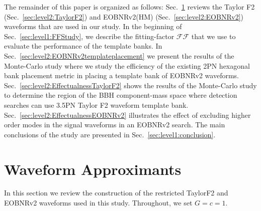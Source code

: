 \documentclass[aps,
prd,
amsmath,
amssymb,
twocolumn,
floatfix,
groupedaddress]{revtex4-1}
\newcommand{\FF}{\mathcal{FF}}
\begin{document}
The remainder of this paper is organized as follows: Sec.~\ref{sec:level1:WaveformApproximants} reviews the Taylor F2 (Sec.~\ref{sec:level2:TaylorF2}) and EOBNRv2(HM) (Sec.~\ref{sec:level2:EOBNRv2}) waveforms that are used in our study. In the beginning of Sec.~\ref{sec:level1:FFStudy}, we describe the fitting-factor $\FF$ that we use to evaluate the performance of the template banks. In Sec.~\ref{sec:level2:EOBNRv2templateplacement} we present the results of the Monte-Carlo study where we study the efficiency of the existing 2PN hexagonal bank placement metric in placing a template bank of EOBNRv2 waveforms. Sec.~\ref{sec:level2:EffectualnessTaylorF2} shows the results of the Monte-Carlo study to determine the region of the BBH component-mass space where detection searches can use 3.5PN Taylor F2 waveform template bank. Sec.~\ref{sec:level2:EffectualnessEOBNRv2} illustrates the effect of excluding higher order modes in the signal waveforms in an EOBNRv2 search. The main conclusions of the study are 
presented in Sec.~\ref{sec:level1:conclusion}.


\section{Waveform Approximants}\label{sec:level1:WaveformApproximants}
In this section we review the construction of the restricted TaylorF2 and EOBNRv2 waveforms used in this study. Throughout, we set $G=c=1$.
\end{document}
